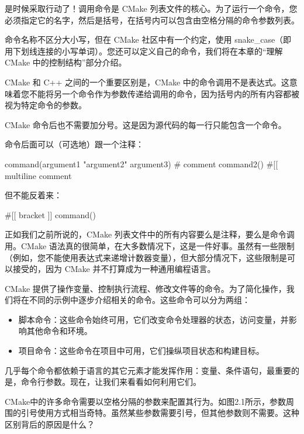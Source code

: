 
是时候采取行动了！调用命令是 CMake 列表文件的核心。为了运行一个命令，您必须指定它的名字，然后是括号，在括号内可以包含由空格分隔的命令参数列表。


命令名称不区分大小写，但在 CMake 社区中有一个约定，使用 snake\_case（即用下划线连接的小写单词）。您还可以定义自己的命令，我们将在本章的“理解 CMake 中的控制结构”部分介绍。

CMake 和 C++ 之间的一个重要区别是，CMake 中的命令调用不是表达式。这意味着您不能将另一个命令作为参数传递给调用的命令，因为括号内的所有内容都被视为特定命令的参数。

CMake 命令后也不需要加分号。这是因为源代码的每一行只能包含一个命令。

命令后面可以（可选地）跟一个注释：

\begin{cmake}
command(argument1 "argument2" argument3) # comment
command2() #[[ multiline comment
\end{cmake}

但不能反着来：

\begin{cmake}
#[[ bracket
]] command()
\end{cmake}

正如我们之前所说的，CMake 列表文件中的所有内容要么是注释，要么是命令调用。CMake 语法真的很简单，在大多数情况下，这是一件好事。虽然有一些限制（例如，您不能使用表达式来递增计数器变量），但大部分情况下，这些限制是可以接受的，因为 CMake 并不打算成为一种通用编程语言。

CMake 提供了操作变量、控制执行流程、修改文件等的命令。为了简化操作，我们将在不同的示例中逐步介绍相关的命令。这些命令可以分为两组：

\begin{itemize}
\item
脚本命令：这些命令始终可用，它们改变命令处理器的状态，访问变量，并影响其他命令和环境。

\item
项目命令：这些命令在项目中可用，它们操纵项目状态和构建目标。
\end{itemize}

几乎每个命令都依赖于语言的其它元素才能发挥作用：变量、条件语句，最重要的是，命令行参数。现在，让我们来看看如何利用它们。


CMake中的许多命令需要以空格分隔的参数来配置其行为。如图2.1所示，参数周围的引号使用方式相当奇特。虽然某些参数需要引号，但其他参数则不需要。这种区别背后的原因是什么？

